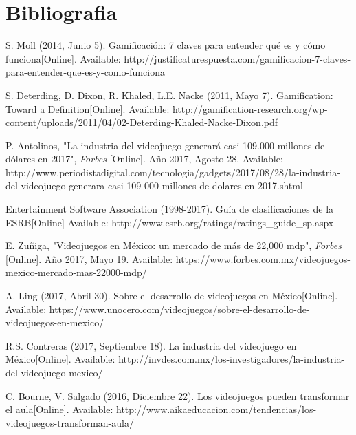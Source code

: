 \chapter{Bibliografia}	

\begin{thebibliography}{X}
	\textnormal S. Moll (2014, Junio 5). Gamificación: 7 claves para entender qué es y cómo funciona[Online]. Available: http://justificaturespuesta.com/gamificacion-7-claves-para-entender-que-es-y-como-funciona
	
	\textnormal S. Deterding, D. Dixon, R. Khaled, L.E. Nacke (2011, Mayo 7). Gamification: Toward a Definition[Online]. Available: http://gamification-research.org/wp-content/uploads/2011/04/02-Deterding-Khaled-Nacke-Dixon.pdf

	\textnormal P. Antolinos, "La industria del videojuego generará casi 109.000 millones de dólares en 2017", \textit{Forbes} [Online]. Año 2017, Agosto 28. Available: http://www.periodistadigital.com/tecnologia/gadgets/2017/08/28/la-industria-del-videojuego-generara-casi-109-000-millones-de-dolares-en-2017.shtml
	
	\textnormal Entertainment Software Association (1998-2017). Guía de clasificaciones de la ESRB[Online] Available: http://www.esrb.org/ratings/ratings\_guide\_sp.aspx
		
	\textnormal E. Zuñiga, "Videojuegos en México: un mercado de más de 22,000 mdp", \textit{Forbes} [Online]. Año 2017, Mayo 19. Available: https://www.forbes.com.mx/videojuegos-mexico-mercado-mas-22000-mdp/
	
	\textnormal A. Ling (2017, Abril 30). Sobre el desarrollo de videojuegos en México[Online]. Available: https://www.unocero.com/videojuegos/sobre-el-desarrollo-de-videojuegos-en-mexico/
	
	
	\textnormal R.S. Contreras (2017, Septiembre 18). La industria del videojuego en México[Online]. Available: http://invdes.com.mx/los-investigadores/la-industria-del-videojuego-mexico/
	
	\textnormal C. Bourne, V. Salgado (2016, Diciembre 22). Los videojuegos pueden transformar el aula[Online]. Available: http://www.aikaeducacion.com/tendencias/los-videojuegos-transforman-aula/
	

\end{thebibliography}
